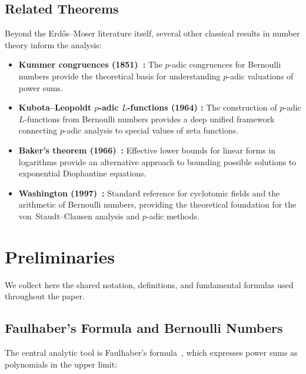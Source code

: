 \documentclass[12pt,a4paper]{article}
\theoremstyle{plain}
\theoremstyle{definition}
\begin{document}
\subsection{Related Theorems}

Beyond the Erd\H{o}s--Moser literature itself, several other classical
results in number theory inform the analysis:

\begin{itemize}[nosep]
  \item \textbf{Kummer congruences (1851)~\cite{Kummer}:} The
    $p$-adic congruences for Bernoulli numbers provide the theoretical
    basis for understanding $p$-adic valuations of power sums.
  \item \textbf{Kubota--Leopoldt $p$-adic $L$-functions (1964)
    \cite{KubotaLeopoldt}:} The construction of $p$-adic $L$-functions
    from Bernoulli numbers provides a deep unified framework
    connecting $p$-adic analysis to special values of zeta functions.
  \item \textbf{Baker's theorem (1966)~\cite{Baker}:} Effective lower
    bounds for linear forms in logarithms provide an alternative
    approach to bounding possible solutions to exponential Diophantine
    equations.
  \item \textbf{Washington (1997)~\cite{Washington}:} Standard
    reference for cyclotomic fields and the arithmetic of Bernoulli
    numbers, providing the theoretical foundation for the
    von~Staudt--Clausen analysis and $p$-adic methods.
\end{itemize}

\section{Preliminaries}
\label{sec:preliminaries}

We collect here the shared notation, definitions, and fundamental formulas
used throughout the paper.

\subsection{Faulhaber's Formula and Bernoulli Numbers}

The central analytic tool is Faulhaber's formula~\cite{Faulhaber,Bernoulli},
which expresses power sums as polynomials in the upper limit:
\end{document}
